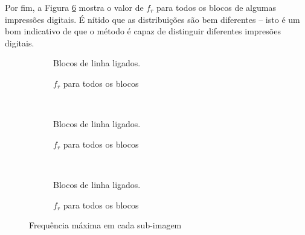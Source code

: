 \documentclass[10pt,a4paper]{article}
\begin{document}
Por fim, a Figura \ref{fig:fingerprint_all} mostra o valor de $f_r$ para todos os blocos de algumas impressões digitais. É nítido que as distribuições são bem diferentes -- isto é um bom indicativo de que o método é capaz de distinguir diferentes impresões digitais.
\begin{figure}[!htb]
    \begin{subfigure}[ht]{0.45\textwidth}
    \centering
        \caption{Blocos de linha ligados.}
        \label{fig:fingerprint}
    \end{subfigure}
    \qquad
    \begin{subfigure}[ht]{0.45\textwidth}
        \caption{$f_r$ para todos os blocos}
        \label{fig:fingerprint_all}
    \end{subfigure}
    \\
    \begin{subfigure}[ht]{0.45\textwidth}
    \centering
        \caption{Blocos de linha ligados.}
        \label{fig:fingerprint}
    \end{subfigure}
    \qquad
    \begin{subfigure}[ht]{0.45\textwidth}
        \caption{$f_r$ para todos os blocos}
        \label{fig:fingerprint_all}
    \end{subfigure}
    \\
    \begin{subfigure}[ht]{0.45\textwidth}
    \centering
        \caption{Blocos de linha ligados.}
        \label{fig:fingerprint}
    \end{subfigure}
    \qquad
    \begin{subfigure}[ht]{0.45\textwidth}
        \caption{$f_r$ para todos os blocos}
        \label{fig:fingerprint_all}
    \end{subfigure}
    \caption{Frequência máxima em cada sub-imagem}
    \label{fig:all}
\end{figure}
\end{document}
